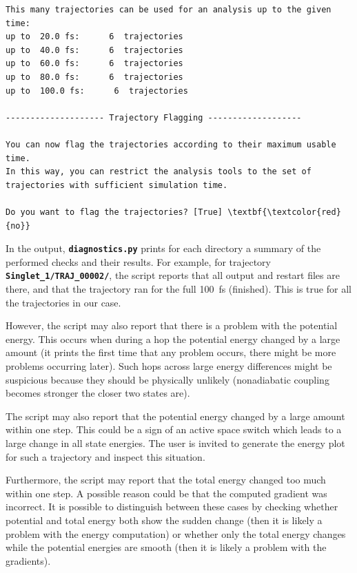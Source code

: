 \documentclass[a4paper,11pt,DIV=15,openany]{scrbook}
\newcommand{\ttt}[1]{\textbf{\texttt{#1}}}
\begin{document}
\begin{oframed}
\begin{Verbatim}[commandchars=\\\{\}]
This many trajectories can be used for an analysis up to the given time:
up to  20.0 fs:      6  trajectories
up to  40.0 fs:      6  trajectories
up to  60.0 fs:      6  trajectories
up to  80.0 fs:      6  trajectories
up to  100.0 fs:      6  trajectories

-------------------- Trajectory Flagging -------------------

You can now flag the trajectories according to their maximum usable time.
In this way, you can restrict the analysis tools to the set of trajectories with sufficient simulation time.

Do you want to flag the trajectories? [True] \textbf{\textcolor{red}{no}}

\end{Verbatim}
\end{oframed}

\normalsize

In the output, \ttt{diagnostics.py} prints for each directory a summary of the performed checks and their results.
For example, for trajectory \ttt{Singlet\_1/TRAJ\_00002/}, the script reports that all output and restart files are there, and that the trajectory ran for the full 100~fs (finished). 
This is true for all the trajectories in our case.

However, the script may also report that there is a problem with the potential energy.
This occurs when during a hop the potential energy changed by a large amount (it prints the first time that any problem occurs, there might be more problems occurring later).
Such hops across large energy differences might be suspicious because they should be physically unlikely (nonadiabatic coupling becomes stronger the closer two states are).

The script may also report that the potential energy changed by a large amount within one step.
This could be a sign of an active space switch which leads to a large change in all state energies.
The user is invited to generate the energy plot for such a trajectory and inspect this situation.

Furthermore, the script may report that the total energy changed too much within one step.
A possible reason could be that the computed gradient was incorrect.
It is possible to distinguish between these cases by checking whether potential and total energy both show the sudden change (then it is likely a problem with the energy computation) or whether only the total energy changes while the potential energies are smooth (then it is likely a problem with the gradients).
\end{document}
